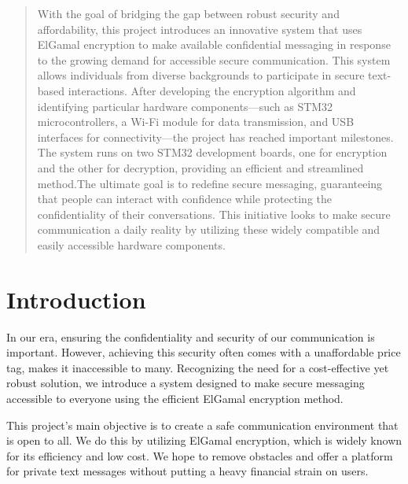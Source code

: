 \documentclass[12pt]{article}
\begin{document}
	
	
	\renewcommand{\abstractname}{Summary}
	\begin{abstract}
		With the goal of bridging the gap between robust security and affordability, this project introduces an innovative system that uses ElGamal encryption to make available confidential messaging in response to the growing demand for accessible secure communication. This system allows individuals from diverse backgrounds to participate in secure text-based interactions. After developing the encryption algorithm and identifying particular hardware components—such as STM32 microcontrollers, a Wi-Fi module for data transmission, and USB interfaces for connectivity—the project has reached important milestones. The system runs on two STM32 development boards, one for encryption and the other for decryption, providing an efficient and streamlined method.The ultimate goal is to redefine secure messaging, guaranteeing that people can interact with confidence while protecting the confidentiality of their conversations. This initiative looks to make secure communication a daily reality by utilizing these widely compatible and easily accessible hardware components.
		
	\end{abstract}
	

\clearpage %
	\section{Introduction}
In our era, ensuring the confidentiality and security of our communication is important. However, achieving this security often comes with a unaffordable price tag, makes it inaccessible to many. Recognizing the need for a cost-effective yet robust solution, we introduce a system designed to make secure messaging accessible to everyone using the efficient ElGamal encryption method.

This project's main objective is to create a safe communication environment that is open to all. We do this by utilizing ElGamal encryption, which is widely known for its efficiency and low cost. We hope to remove obstacles and offer a platform for private text messages without putting a heavy financial strain on users.
\end{document}

